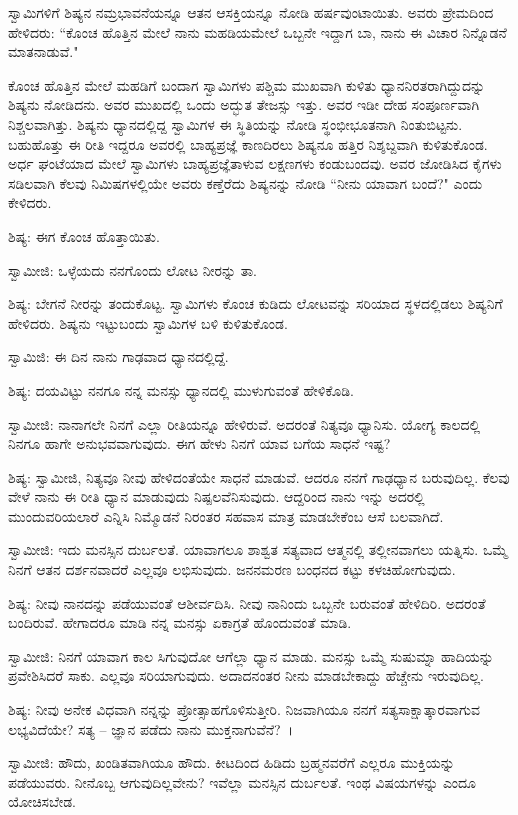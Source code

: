 ಸ್ವಾಮಿಗಳಿಗೆ ಶಿಷ್ಯನ ನಮ್ರಭಾವನೆಯನ್ನೂ ಆತನ ಆಸಕ್ತಿಯನ್ನೂ ನೋಡಿ ಹರ್ಷವುಂಟಾಯಿತು. ಅವರು ಪ್ರೇಮದಿಂದ ಹೇಳಿದರು: “ಕೊಂಚ ಹೊತ್ತಿನ ಮೇಲೆ ನಾನು ಮಹಡಿಯಮೇಲೆ ಒಬ್ಬನೇ ಇದ್ದಾಗ ಬಾ, ನಾನು ಈ ವಿಚಾರ ನಿನ್ನೊಡನೆ ಮಾತನಾಡುವೆ."

ಕೊಂಚ ಹೊತ್ತಿನ ಮೇಲೆ ಮಹಡಿಗೆ ಬಂದಾಗ ಸ್ವಾಮಿಗಳು ಪಶ್ಚಿಮ ಮುಖವಾಗಿ ಕುಳಿತು ಧ್ಯಾನನಿರತರಾಗಿದ್ದುದನ್ನು ಶಿಷ್ಯನು ನೋಡಿದನು. ಅವರ ಮುಖದಲ್ಲಿ ಒಂದು ಅದ್ಭುತ ತೇಜಸ್ಸು ಇತ್ತು. ಅವರ ಇಡೀ ದೇಹ ಸಂಪೂರ್ಣವಾಗಿ ನಿಶ್ಚಲವಾಗಿತ್ತು. ಶಿಷ್ಯನು ಧ್ಯಾನದಲ್ಲಿದ್ದ ಸ್ವಾಮಿಗಳ ಈ ಸ್ಥಿತಿಯನ್ನು ನೋಡಿ ಸ್ಥಂಭೀಭೂತನಾಗಿ ನಿಂತುಬಿಟ್ಟನು. ಬಹುಹೊತ್ತು ಈ ರೀತಿ ಇದ್ದರೂ ಅವರಲ್ಲಿ ಬಾಹ್ಯಪ್ರಜ್ಞೆ ಕಾಣದಿರಲು ಶಿಷ್ಯನೂ ಹತ್ತಿರ ನಿಶ್ಶಬ್ದವಾಗಿ ಕುಳಿತುಕೊಂಡ. ಅರ್ಧ ಘಂಟೆಯಾದ ಮೇಲೆ ಸ್ವಾಮಿಗಳು ಬಾಹ್ಯಪ್ರಜ್ಞೆತಾಳುವ ಲಕ್ಷಣಗಳು ಕಂಡುಬಂದವು. ಅವರ ಜೋಡಿಸಿದ ಕೈಗಳು ಸಡಿಲವಾಗಿ ಕೆಲವು ನಿಮಿಷಗಳಲ್ಲಿಯೇ ಅವರು ಕಣ್ತೆರೆದು ಶಿಷ್ಯನನ್ನು ನೋಡಿ “ನೀನು ಯಾವಾಗ ಬಂದೆ?" ಎಂದು ಕೇಳಿದರು.

ಶಿಷ್ಯ: ಈಗ ಕೊಂಚ ಹೊತ್ತಾಯಿತು.

ಸ್ವಾಮೀಜಿ: ಒಳ್ಳೆಯದು ನನಗೊಂದು ಲೋಟ ನೀರನ್ನು ತಾ.

ಶಿಷ್ಯ: ಬೇಗನೆ ನೀರನ್ನು ತಂದುಕೊಟ್ಟ. ಸ್ವಾಮಿಗಳು ಕೊಂಚ ಕುಡಿದು ಲೋಟವನ್ನು ಸರಿಯಾದ ಸ್ಥಳದಲ್ಲಿಡಲು ಶಿಷ್ಯನಿಗೆ ಹೇಳಿದರು. ಶಿಷ್ಯನು ಇಟ್ಟುಬಂದು ಸ್ವಾಮಿಗಳ ಬಳಿ ಕುಳಿತುಕೊಂಡ.

ಸ್ವಾಮಿಜಿ: ಈ ದಿನ ನಾನು ಗಾಢವಾದ ಧ್ಯಾನದಲ್ಲಿದ್ದೆ.

ಶಿಷ್ಯ: ದಯವಿಟ್ಟು ನನಗೂ ನನ್ನ ಮನಸ್ಸು ಧ್ಯಾನದಲ್ಲಿ ಮುಳುಗುವಂತೆ ಹೇಳಿಕೊಡಿ.

ಸ್ವಾಮೀಜಿ: ನಾನಾಗಲೇ ನಿನಗೆ ಎಲ್ಲಾ ರೀತಿಯನ್ನೂ ಹೇಳಿರುವೆ. ಅದರಂತೆ ನಿತ್ಯವೂ ಧ್ಯಾನಿಸು. ಯೋಗ್ಯ ಕಾಲದಲ್ಲಿ ನಿನಗೂ ಹಾಗೇ ಅನುಭವವಾಗುವುದು. ಈಗ ಹೇಳು ನಿನಗೆ ಯಾವ ಬಗೆಯ ಸಾಧನೆ ಇಷ್ಟ?

ಶಿಷ್ಯ: ಸ್ವಾಮೀಜಿ, ನಿತ್ಯವೂ ನೀವು ಹೇಳಿದಂತೆಯೇ ಸಾಧನೆ ಮಾಡುವೆ. ಆದರೂ ನನಗೆ ಗಾಢಧ್ಯಾನ ಬರುವುದಿಲ್ಲ. ಕೆಲವು ವೇಳೆ ನಾನು ಈ ರೀತಿ ಧ್ಯಾನ ಮಾಡುವುದು ನಿಷ್ಪಲವೆನಿಸುವುದು. ಆದ್ದರಿಂದ ನಾನು ಇನ್ನು ಅದರಲ್ಲಿ ಮುಂದುವರಿಯಲಾರೆ ಎನ್ನಿಸಿ ನಿಮ್ಮೊಡನೆ ನಿರಂತರ ಸಹವಾಸ ಮಾತ್ರ ಮಾಡಬೇಕೆಂಬ ಆಸೆ ಬಲವಾಗಿದೆ.

ಸ್ವಾಮೀಜಿ: ಇದು ಮನಸ್ಸಿನ ದುರ್ಬಲತೆ. ಯಾವಾಗಲೂ ಶಾಶ್ವತ ಸತ್ಯವಾದ ಆತ್ಮನಲ್ಲಿ ತಲ್ಲೀನವಾಗಲು ಯತ್ನಿಸು. ಒಮ್ಮೆ ನಿನಗೆ ಆತನ ದರ್ಶನವಾದರೆ ಎಲ್ಲವೂ ಲಭಿಸುವುದು. ಜನನಮರಣ ಬಂಧನದ ಕಟ್ಟು ಕಳಚಿಹೋಗುವುದು.

ಶಿಷ್ಯ: ನೀವು ನಾನದನ್ನು ಪಡೆಯುವಂತೆ ಆಶೀರ್ವದಿಸಿ. ನೀವು ನಾನಿಂದು ಒಬ್ಬನೇ ಬರುವಂತೆ ಹೇಳಿದಿರಿ. ಅದರಂತೆ ಬಂದಿರುವೆ. ಹೇಗಾದರೂ ಮಾಡಿ ನನ್ನ ಮನಸ್ಸು ಏಕಾಗ್ರತೆ ಹೊಂದುವಂತೆ ಮಾಡಿ.

ಸ್ವಾಮೀಜಿ: ನಿನಗೆ ಯಾವಾಗ ಕಾಲ ಸಿಗುವುದೋ ಆಗೆಲ್ಲಾ ಧ್ಯಾನ ಮಾಡು. ಮನಸ್ಸು ಒಮ್ಮೆ ಸುಷುಮ್ನಾ ಹಾದಿಯನ್ನು ಪ್ರವೇಶಿಸಿದರೆ ಸಾಕು. ಎಲ್ಲವೂ ಸರಿಯಾಗುವುದು. ಅದಾದನಂತರ ನೀನು ಮಾಡಬೇಕಾದ್ದು ಹೆಚ್ಚೇನು ಇರುವುದಿಲ್ಲ.

ಶಿಷ್ಯ: ನೀವು ಅನೇಕ ವಿಧವಾಗಿ ನನ್ನನ್ನು ಪ್ರೋತ್ಸಾಹಗೊಳಿಸುತ್ತೀರಿ. ನಿಜವಾಗಿಯೂ ನನಗೆ ಸತ್ಯಸಾಕ್ಷಾತ್ಕಾರವಾಗುವ ಲಭ್ಯವಿದೆಯೇ? ಸತ್ಯ – ಜ್ಞಾನ ಪಡೆದು ನಾನು ಮುಕ್ತನಾಗುವೆನೆ?~।

ಸ್ವಾಮೀಜಿ: ಹೌದು, ಖಂಡಿತವಾಗಿಯೂ ಹೌದು. ಕೀಟದಿಂದ ಹಿಡಿದು ಬ್ರಹ್ಮನವರೆಗೆ ಎಲ್ಲರೂ ಮುಕ್ತಿಯನ್ನು ಪಡೆಯುವರು. ನೀನೊಬ್ಬ ಆಗುವುದಿಲ್ಲವೇನು? ಇವೆಲ್ಲಾ ಮನಸ್ಸಿನ ದುರ್ಬಲತೆ. ಇಂಥ ವಿಷಯಗಳನ್ನು ಎಂದೂ ಯೋಚಿಸಬೇಡ.

